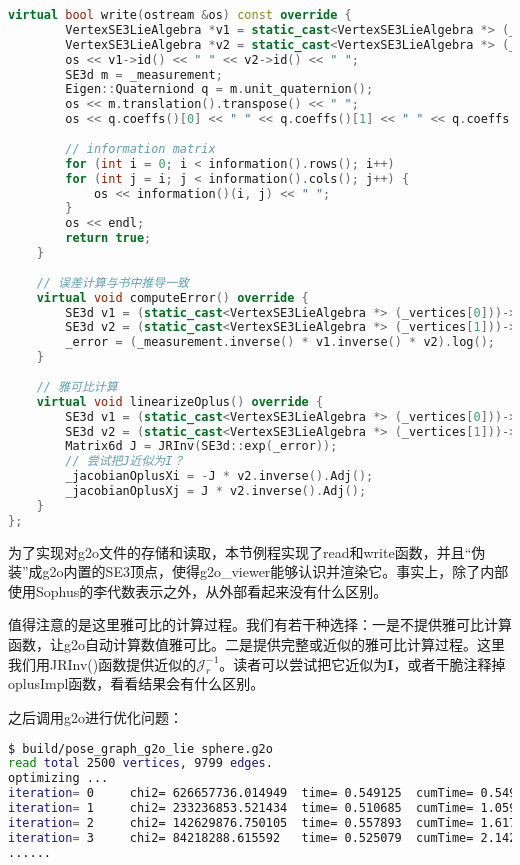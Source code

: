 \begin{lstlisting}[language=c++,caption=slambook2/ch10/pose\_graph\_g2o\_lie\_algebra.cpp（片段）]
    virtual bool write(ostream &os) const override {
        VertexSE3LieAlgebra *v1 = static_cast<VertexSE3LieAlgebra *> (_vertices[0]);
        VertexSE3LieAlgebra *v2 = static_cast<VertexSE3LieAlgebra *> (_vertices[1]);
        os << v1->id() << " " << v2->id() << " ";
        SE3d m = _measurement;
        Eigen::Quaterniond q = m.unit_quaternion();
        os << m.translation().transpose() << " ";
        os << q.coeffs()[0] << " " << q.coeffs()[1] << " " << q.coeffs()[2] << " " << q.coeffs()[3] << " ";
        
        // information matrix 
        for (int i = 0; i < information().rows(); i++)
        for (int j = i; j < information().cols(); j++) {
            os << information()(i, j) << " ";
        }
        os << endl;
        return true;
    }
    
    // 误差计算与书中推导一致
    virtual void computeError() override {
        SE3d v1 = (static_cast<VertexSE3LieAlgebra *> (_vertices[0]))->estimate();
        SE3d v2 = (static_cast<VertexSE3LieAlgebra *> (_vertices[1]))->estimate();
        _error = (_measurement.inverse() * v1.inverse() * v2).log();
    }
    
    // 雅可比计算
    virtual void linearizeOplus() override {
        SE3d v1 = (static_cast<VertexSE3LieAlgebra *> (_vertices[0]))->estimate();
        SE3d v2 = (static_cast<VertexSE3LieAlgebra *> (_vertices[1]))->estimate();
        Matrix6d J = JRInv(SE3d::exp(_error));
        // 尝试把J近似为I？
        _jacobianOplusXi = -J * v2.inverse().Adj();
        _jacobianOplusXj = J * v2.inverse().Adj();
    }
};
\end{lstlisting}


为了实现对g2o文件的存储和读取，本节例程实现了read和write函数，并且“伪装”成g2o内置的SE3顶点，使得g2o\_viewer能够认识并渲染它。事实上，除了内部使用Sophus的李代数表示之外，从外部看起来没有什么区别。

值得注意的是这里雅可比的计算过程。我们有若干种选择：一是不提供雅可比计算函数，让g2o自动计算数值雅可比。二是提供完整或近似的雅可比计算过程。这里我们用JRInv()函数提供近似的$\bm{\mathcal{J}}_r^{-1}$。读者可以尝试把它近似为$\bm{I}$，或者干脆注释掉oplusImpl函数，看看结果会有什么区别。

之后调用g2o进行优化问题：

\begin{lstlisting}[language=sh,caption=终端输入：]
$ build/pose_graph_g2o_lie sphere.g2o    
read total 2500 vertices, 9799 edges.
optimizing ...
iteration= 0	 chi2= 626657736.014949	 time= 0.549125	 cumTime= 0.549125	 edges= 9799	 schur= 0	 lambda= 6706.585223	 levenbergIter= 1
iteration= 1	 chi2= 233236853.521434	 time= 0.510685	 cumTime= 1.05981	 edges= 9799	 schur= 0	 lambda= 2235.528408	 levenbergIter= 1
iteration= 2	 chi2= 142629876.750105	 time= 0.557893	 cumTime= 1.6177	 edges= 9799	 schur= 0	 lambda= 745.176136	 levenbergIter= 1
iteration= 3	 chi2= 84218288.615592	 time= 0.525079	 cumTime= 2.14278	 edges= 9799	 schur= 0	 lambda= 248.392045	 levenbergIter= 1
......
\end{lstlisting}

